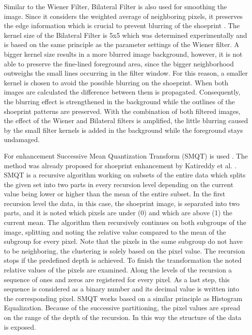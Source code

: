\documentclass[draft,final]{vutinfth} %
\begin{document}
Similar to the Wiener Filter, Bilateral Filter is also used for smoothing the image.
Since it considers the weighted average of neighboring pixels, it preserves the edge information which is crucial to prevent blurring of the shoeprint \cite{elad2002origin}. 
The kernel size of the Bilateral Filter is 5x5 which was determined experimentally and is based on the same principle as the parameter settings of the Wiener filter.
A bigger kernel size results in a more blurred image background, however, it is not able to preserve the fine-lined foreground area, since the bigger neighborhood outweighs the small lines occurring in the filter window.
For this reason, a smaller kernel is chosen to avoid the possible blurring on the shoeprint.
When both images are calculated the difference between them is propagated.
Consequently, the blurring effect is strengthened in the background while the outlines of the shoeprint patterns are preserved.
With the combination of both filtered images, the effect of the Wiener and Bilateral filters is amplified, the little blurring caused by the small filter kernels is added in the background while the foreground stays undamaged.
\par
For enhancement Successive Mean Quantization Transform (SMQT) is used \cite{nilsson2013smqt}.
The method was already proposed for shoeprint enhancement by Katireddy et al. \cite{katireddy2017novel}.
SMQT is a recursive algorithm working on subsets of the entire data which splits the given set into two parts in every recursion level depending on the current value being lower or higher than the mean of the entire subset.
In the first recursion level the data, in this case, the shoeprint image, is separated into two parts, and it is noted which pixels are under (0) and which are above (1) the current mean. 
The algorithm then recursively continues on both subgroups of the image, splitting and noting the relative value compared to the mean of the subgroup for every pixel.
Note that the pixels in the same subgroup do not have to be neighboring, the clustering is solely based on the pixel value.
The recursion stops if the predefined depth is achieved. 
To finish the transformation the noted relative values of the pixels are examined.
Along the levels of the recursion a sequence of ones and zeros are registered for every pixel.
As a last step, this sequence is considered as a binary number and its decimal value is written into the corresponding pixel.
SMQT works based on a similar principle as Histogram Equalization.
Because of the successive partitioning, the pixel values are spread on the range of the depth of the recursion.
In this way the structure of the data is exposed.
\end{document}
